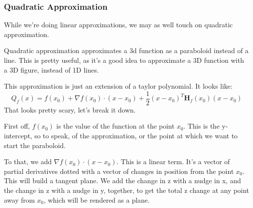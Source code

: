 \documentclass[12pt, letterpaper]{article}
\begin{document}
\subsubsection{Quadratic Approximation}
While we're doing linear approximations, we may as well touch on quadratic approximation.

Quadratic approximation approximates a 3d function as a paraboloid instead of a line. This is pretty useful, as it's a good idea to approximate a 3D function with a 3D figure, instead of 1D lines.

This approximation is just an extension of a taylor polynomial. It looks like:
\begin{displaymath}
    Q_f(x) = f(x_0) + \nabla f(x_0)\cdot(x-x_0)+\frac{1}{2}(x-x_0)^T\mathbf{H}_f(x_0)(x-x_0)
\end{displaymath}
That looks pretty scary, let's break it down.

First off, $f(x_0)$ is the value of the function at the point $x_0$. This is the y-intercept, so to speak, of the approximation, or the point at which we want to start the paraboloid.

To that, we add $\nabla f(x_0)\cdot(x-x_0)$. This is a linear term. It's a vector of partial derivatives dotted with a vector of changes in position from the point $x_0$. This will build a tangent plane. We add the change in z with a nudge in x, and the change in z with a nudge in y, together, to get the total z change at any point away from $x_0$, which will be rendered as a plane.
\end{document}
